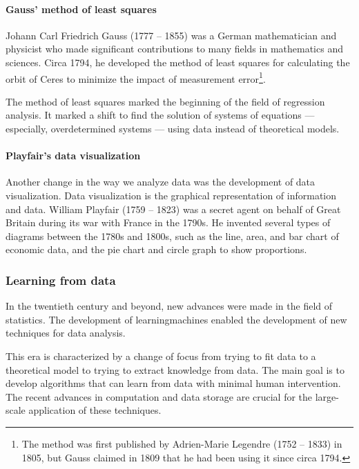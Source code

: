\paragraph{Gauss' method of least squares}

Johann Carl Friedrich Gauss (1777 -- 1855) was a German mathematician and physicist who made
significant contributions to many fields in mathematics and sciences.  Circa 1794, he
developed the method of least squares for calculating the orbit of
Ceres to minimize the impact of measurement error\footnote{The method was first published by
Adrien-Marie Legendre (1752 -- 1833) in 1805, but Gauss claimed in 1809 that he had been
using it since circa 1794.}.

The method of least squares marked the beginning of the field of regression analysis.  It
marked a shift to find the solution of systems of equations --- especially, overdetermined
systems --- using data instead of theoretical models.

\paragraph{Playfair's data visualization}

Another change in the way we analyze data was the development of data visualization.  Data
visualization is the graphical representation of information and data.
William Playfair (1759 -- 1823) was a secret agent on behalf of Great Britain during its
war with France in the 1790s.  He invented several types of diagrams
between the 1780s and 1800s, such as the line, area, and bar chart of economic data, and
the pie chart and circle graph to show proportions.

\subsubsection{Learning from data}

In the twentieth century and beyond, new advances were made in the field of statistics.
The development of \glspl{learningmachine} enabled the development of new techniques for data
analysis.

This era is characterized by a change of focus from trying to fit data to a theoretical
model to trying to extract knowledge from data.  The main goal is to develop algorithms
that can learn from data with minimal human intervention.
The recent advances in computation and data storage are crucial for the large-scale
application of these techniques.


